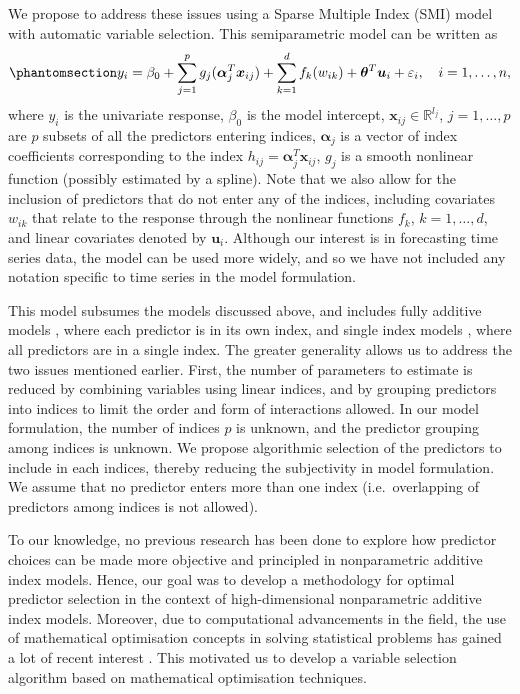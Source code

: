 \documentclass[
  11pt,
  a4paper,
]{article}
\begin{document}
We propose to address these issues using a Sparse Multiple Index (SMI)
model with automatic variable selection. This semiparametric model can
be written as \begin{equation}\phantomsection\label{eq-semipara}{
  y_{i} = \beta_{0} + \sum_{j = 1}^{p}g_{j}(\bm{\alpha}_{j}^{T}\bm{x}_{ij}) + \sum_{k = 1}^{d}f_{k}(w_{ik}) + \bm{\theta}^{T}\bm{u}_{i} + \varepsilon_{i}, \quad i = 1, \dots, n,
}\end{equation} where \(y_{i}\) is the univariate response,
\(\beta_{0}\) is the model intercept,
\(\bm{x}_{ij} \in \mathbb{R}^{l_{j}}\), \(j = 1, \dots, p\) are \(p\)
subsets of all the predictors entering indices, \(\bm{\alpha}_{j}\) is a
vector of index coefficients corresponding to the index
\(h_{ij} = \bm{\alpha}_{j}^{T}\bm{x}_{ij}\), \(g_{j}\) is a smooth
nonlinear function (possibly estimated by a spline). Note that we also
allow for the inclusion of predictors that do not enter any of the
indices, including covariates \(w_{ik}\) that relate to the response
through the nonlinear functions \(f_{k}\), \(k = 1, \dots, d\), and
linear covariates denoted by \(\bm{u}_{i}\). Although our interest is in
forecasting time series data, the model can be used more widely, and so
we have not included any notation specific to time series in the model
formulation.

This model subsumes the models discussed above, and includes fully
additive models \autocite{Wood2011,Wood2017}, where each predictor is in
its own index, and single index models
\autocite{Stoker1986,Hardle1993,Radchenko2015}, where all predictors are
in a single index. The greater generality allows us to address the two
issues mentioned earlier. First, the number of parameters to estimate is
reduced by combining variables using linear indices, and by grouping
predictors into indices to limit the order and form of interactions
allowed. In our model formulation, the number of indices \(p\) is
unknown, and the predictor grouping among indices is unknown. We propose
algorithmic selection of the predictors to include in each indices,
thereby reducing the subjectivity in model formulation. We assume that
no predictor enters more than one index (i.e.~overlapping of predictors
among indices is not allowed).

To our knowledge, no previous research has been done to explore how
predictor choices can be made more objective and principled in
nonparametric additive index models. Hence, our goal was to develop a
methodology for optimal predictor selection in the context of
high-dimensional nonparametric additive index models. Moreover, due to
computational advancements in the field, the use of mathematical
optimisation concepts in solving statistical problems has gained a lot
of recent interest \autocite{Theusl2020}. This motivated us to develop a
variable selection algorithm based on mathematical optimisation
techniques.
\end{document}
